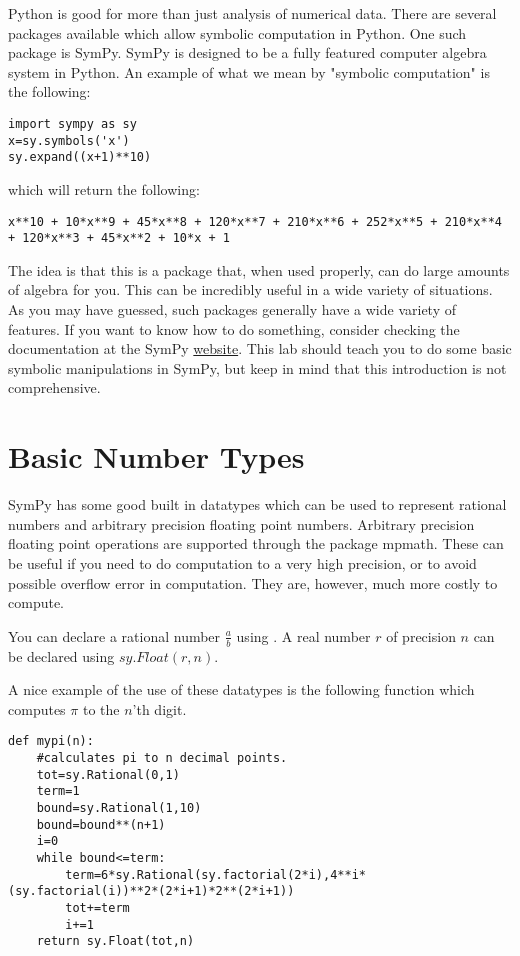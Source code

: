 \label{lab:SymPy}


Python is good for more than just analysis of numerical data.
There are several packages available which allow symbolic computation in Python.
One such package is SymPy.
SymPy is designed to be a fully featured computer algebra system in Python.
An example of what we mean by "symbolic computation" is the following:
\begin{lstlisting}
import sympy as sy
x=sy.symbols('x')
sy.expand((x+1)**10)
\end{lstlisting}
which will return the following:
\begin{lstlisting}
x**10 + 10*x**9 + 45*x**8 + 120*x**7 + 210*x**6 + 252*x**5 + 210*x**4 + 120*x**3 + 45*x**2 + 10*x + 1
\end{lstlisting}
The idea is that this is a package that, when used properly, can do large amounts of algebra for you.
This can be incredibly useful in a wide variety of situations.
As you may have guessed, such packages generally have a wide variety of features. 
If you want to know how to do something, consider checking the documentation  at the SymPy \href{http://sympy.org/en/index.htmll}{website}.
This lab should teach you to do some basic symbolic manipulations in SymPy, but keep in mind that this introduction is not comprehensive.

\section*{Basic Number Types}
SymPy has some good built in datatypes which can be used to represent rational numbers and arbitrary precision floating point numbers.
Arbitrary precision floating point operations are supported through the package mpmath.
These can be useful if you need to do computation to a very high precision, or to avoid possible overflow error in computation.
They are, however, much more costly to compute.

You can declare a rational number $\frac{a}{b}$ using .
A real number $r$ of precision $n$ can be declared using $sy.Float(r,n)$.

A nice example of the use of these datatypes is the following function which computes $\pi$ to the $n$'th digit.
\begin{lstlisting}
def mypi(n):
    #calculates pi to n decimal points.
    tot=sy.Rational(0,1)
    term=1
    bound=sy.Rational(1,10)
    bound=bound**(n+1)
    i=0
    while bound<=term:
        term=6*sy.Rational(sy.factorial(2*i),4**i*(sy.factorial(i))**2*(2*i+1)*2**(2*i+1))
        tot+=term
        i+=1
    return sy.Float(tot,n)
\end{lstlisting}

